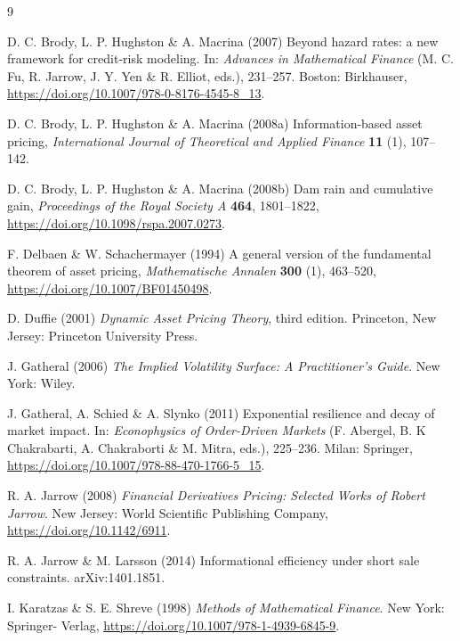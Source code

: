 \documentclass{ws-ijtaf}
\begin{document}
\begin{thebibliography}{9}

 D. C. Brody, L. P. Hughston \& A. Macrina (2007) Beyond hazard rates: a new framework for credit-risk modeling. In: {\it Advances in Mathematical Finance} (M. C. Fu, R. Jarrow, J. Y. Yen
\& R. Elliot, eds.), 231--257. Boston: Birkhauser, \url{https://doi.org/10.1007/978-0-8176-4545-8_13}.

D. C. Brody, L. P. Hughston \& A. Macrina (2008a) Information-based asset pricing,
{\it International Journal of Theoretical and Applied Finance} {\bf 11} (1), 107--142.

D. C. Brody, L. P. Hughston \& A. Macrina (2008b) Dam rain and cumulative gain,
{\it Proceedings of the Royal Society A} {\bf 464}, 1801--1822, \url{https://doi.org/10.1098/rspa.2007.0273}.

 F. Delbaen \& W. Schachermayer (1994) A general version of the fundamental theorem of asset pricing, {\it Mathematische Annalen} {\bf 300} (1), 463--520, \url{https://doi.org/10.1007/BF01450498}.

 D. Duffie (2001) {\it Dynamic Asset Pricing Theory}, third edition. Princeton, New Jersey: Princeton University Press.

 J. Gatheral (2006) {\it The Implied Volatility Surface: A Practitioner's Guide}. New York: Wiley.

 J. Gatheral, A. Schied \& A. Slynko (2011) Exponential resilience and decay of market impact. In: {\it Econophysics of Order-Driven Markets} (F. Abergel, B. K Chakrabarti, A. Chakraborti \& M. Mitra, eds.), 225--236. Milan: Springer, \url{https://doi.org/10.1007/978-88-470-1766-5_15}.

 R. A. Jarrow (2008) {\it Financial Derivatives Pricing: Selected Works of Robert Jarrow}. New
Jersey: World Scientific Publishing Company, \url{https://doi.org/10.1142/6911}.

 R. A. Jarrow \& M. Larsson (2014) Informational efficiency under short sale constraints. arXiv:1401.1851.

 I. Karatzas \& S. E. Shreve (1998) {\it Methods of Mathematical Finance}. New York: Springer- Verlag, \url{https://doi.org/10.1007/978-1-4939-6845-9}.


\end{thebibliography}
\end{document}

